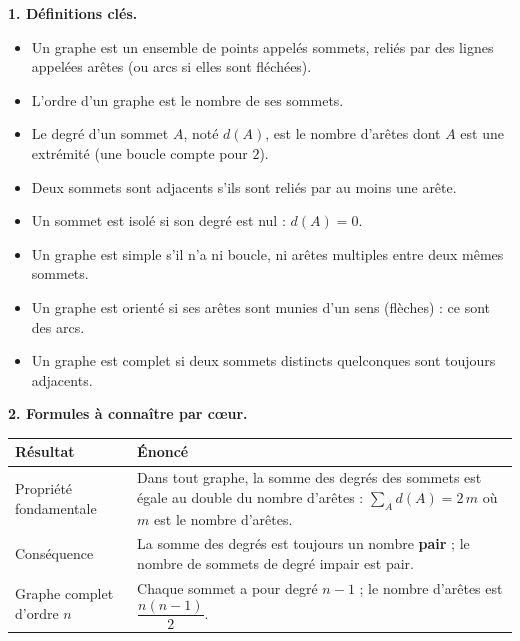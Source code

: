 \documentclass[11pt]{article}
\newcommand{\cle}[1]{{\popxbold\color{popdark}#1}}
\begin{document}
\begin{bilan}
\textbf{1. Définitions clés.}
\begin{itemize}
  \item Un \cle{graphe} est un ensemble de points appelés \cle{sommets}, reliés par des lignes appelées \cle{arêtes} (ou \cle{arcs} si elles sont fléchées).
  \item L'\cle{ordre} d'un graphe est le nombre de ses sommets.
  \item Le \cle{degré} d'un sommet $A$, noté $d(A)$, est le nombre d'arêtes dont $A$ est une extrémité (une boucle compte pour $2$).
  \item Deux sommets sont \cle{adjacents} s'ils sont reliés par au moins une arête.
  \item Un sommet est \cle{isolé} si son degré est nul : $d(A)=0$.
  \item Un graphe est \cle{simple} s'il n'a ni boucle, ni arêtes multiples entre deux mêmes sommets.
  \item Un graphe est \cle{orienté} si ses arêtes sont munies d'un sens (flèches) : ce sont des arcs.
  \item Un graphe est \cle{complet} si deux sommets distincts quelconques sont toujours adjacents.
\end{itemize}

\textbf{2. Formules à connaître par c\oe ur.}
\begin{center}
\begin{tabularx}{\linewidth}{|l|X|}\hline
\rowcolor{popblueL} \textbf{Résultat} & \textbf{Énoncé} \\ \hline
Propriété fondamentale & Dans tout graphe, la somme des degrés des sommets est égale au double du nombre d'arêtes : $\displaystyle\sum_{A} d(A) = 2\,m$ où $m$ est le nombre d'arêtes. \\ \hline
Conséquence & La somme des degrés est toujours un nombre \textbf{pair} ; le nombre de sommets de degré impair est pair. \\ \hline
Graphe complet d'ordre $n$ & Chaque sommet a pour degré $n-1$ ; le nombre d'arêtes est $\dfrac{n(n-1)}{2}$. \\ \hline
\end{tabularx}
\end{center}


\end{bilan}
\end{document}
